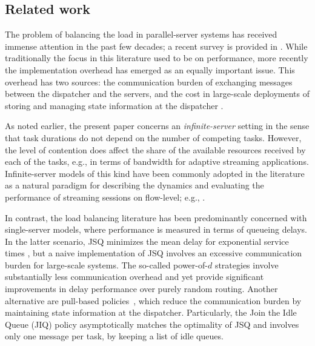 \documentclass[a4paper, 12pt]{article}
\theoremstyle{definition}
\begin{document}
\subsection{Related work}
\label{sub: related work}

The problem of balancing the load in parallel-server systems has received immense attention in the past few decades; a recent survey is provided in \cite{van2018scalable}. While traditionally the focus in this literature used to be on performance, more recently the implementation overhead has emerged as an equally important issue. This overhead has two sources: the communication burden of exchanging messages between the dispatcher and the servers, and the cost in large-scale deployments of storing and managing state information at the dispatcher \cite{gamarnik2018delay,gamarnik2020lower}.

As noted earlier, the present paper concerns an \emph{infinite-server} setting in the sense that task durations do not depend on the number of competing tasks. However, the level of contention does affect the share of the available resources received by each of the tasks, e.g., in terms of bandwidth for adaptive streaming applications. Infinite-server models of this kind have been commonly adopted in the literature as a natural paradigm for describing the dynamics and evaluating the performance of streaming sessions on flow-level; e.g., \cite{benameur2002quality,key2004fair}.

In contrast, the load balancing literature has been predominantly concerned with single-server models, where performance is measured in terms of queueing delays. In the latter scenario, JSQ minimizes the mean delay for exponential service times \cite{ephremides1980simple,winston1977optimality}, but a naive implementation of JSQ involves an excessive communication burden for large-scale systems. The so-called power-of-$d$ strategies \cite{mitzenmacher2001power,mukherjee2016universality,vvedenskaya1996queueing} involve substantially less communication overhead and yet provide significant improvements in delay performance over purely random routing. Another alternative are pull-based policies~\cite{badonnel2008dynamic,stolyar2015pull}, which reduce the communication burden by maintaining state information at the dispatcher. Particularly, the Join the Idle Queue (JIQ) policy \cite{lu2011join,stolyar2015pull} asymptotically matches the optimality of JSQ and involves only one message per task, by keeping a list of idle queues.
\end{document}
